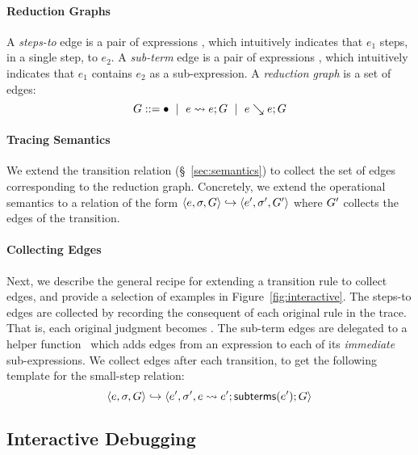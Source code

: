 \paragraph{Reduction Graphs}
%
A \emph{steps-to} edge is a pair of expressions , which
intuitively indicates that $e_1$ steps, in a single step, to $e_2$.
%
A \emph{sub-term} edge is a pair of expressions , which
intuitively indicates that $e_1$ contains $e_2$ as a sub-expression.
%
A \emph{reduction graph} is a set of edges:
$$G ::= \bullet \ \mid \  e \leadsto e; G \ \mid \  e \searrow e; G$$

\paragraph{Tracing Semantics}
%
We extend the transition relation (\S~\ref{sec:semantics}) to
collect the set of edges corresponding to the reduction graph.
%
Concretely, we extend the operational semantics to
a relation of the form $\langle e, \sigma, G \rangle \hookrightarrow \langle e', \sigma', G' \rangle$
where $G'$ collects the edges of the transition.

\paragraph{Collecting Edges}
%
Next, we describe the general recipe for extending a transition
rule to collect edges, and provide a selection of examples
in Figure~\ref{fig:interactive}.
%
The steps-to edges are collected by recording the consequent of
each original rule in the trace. That is, each original judgment
 becomes
.
%
The sub-term edges are delegated to a helper function \subtermssym\
which adds edges from an expression to each of its
\emph{immediate} sub-expressions.
%
We collect \subtermssym edges after each transition,
to get the following template for the small-step relation:
\[
\langle e, \sigma, G \rangle \hookrightarrow \langle e', \sigma', e \leadsto e'; \mathsf{subterms}(e'); G \rangle
\]



\subsection{Interactive Debugging}
\label{sec:traversing-graph}

